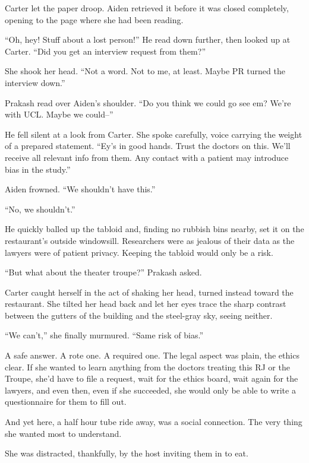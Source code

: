 Carter let the paper droop. Aiden retrieved it before it was closed completely, opening to the page where she had been reading.

``Oh, hey! Stuff about a lost person!'' He read down further, then looked up at Carter. ``Did you get an interview request from them?''

She shook her head. ``Not a word. Not to me, at least. Maybe PR turned the interview down.''

Prakash read over Aiden's shoulder. ``Do you think we could go see em? We're with UCL. Maybe we could--''

He fell silent at a look from Carter. She spoke carefully, voice carrying the weight of a prepared statement. ``Ey's in good hands. Trust the doctors on this. We'll receive all relevant info from them. Any contact with a patient may introduce bias in the study.''

Aiden frowned. ``We shouldn't have this.''

``No, we shouldn't.''

He quickly balled up the tabloid and, finding no rubbish bins nearby, set it on the restaurant's outside windowsill. Researchers were as jealous of their data as the lawyers were of patient privacy. Keeping the tabloid would only be a risk.

``But what about the theater troupe?'' Prakash asked.

Carter caught herself in the act of shaking her head, turned instead toward the restaurant. She tilted her head back and let her eyes trace the sharp contrast between the gutters of the building and the steel-gray sky, seeing neither.

``We can't,'' she finally murmured. ``Same risk of bias.''

A safe answer. A rote one. A required one. The legal aspect was plain, the ethics clear. If she wanted to learn anything from the doctors treating this RJ or the Troupe, she'd have to file a request, wait for the ethics board, wait again for the lawyers, and even then, even if she succeeded, she would only be able to write a questionnaire for them to fill out.

And yet here, a half hour tube ride away, was a social connection. The very thing she wanted most to understand.

She was distracted, thankfully, by the host inviting them in to eat.
